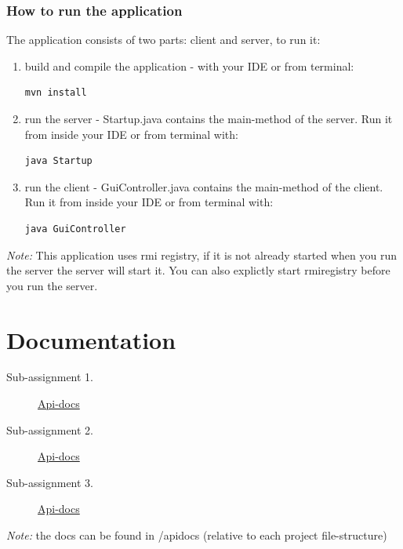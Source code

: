 \documentclass[a4paper, 11pt]{article}
\begin{document}
\subsubsection{How to run the application}
The application consists of two parts: client and server, to run it:
\begin{enumerate}
\item build and compile the application - with your IDE or from terminal:
\begin{verbatim}
mvn install
\end{verbatim}
\item run the server - Startup.java contains the main-method of the server. Run it from inside your IDE or from terminal with: 
\begin{verbatim}
java Startup
\end{verbatim}
\item run the client - GuiController.java contains the main-method of the client. Run it from inside your IDE or from terminal with: 
\begin{verbatim}
java GuiController
\end{verbatim}
\end{enumerate}
\textit{Note:} This application uses rmi registry, if it is not already started when you run the server the server will start it. You can also explictly start rmiregistry before you run the server.
\section{Documentation}
\begin{description}
\item[Sub-assignment 1.] \href{./../ID2212project_assignment1/apidocs/index.html}{Api-docs} 
\item[Sub-assignment 2.] \href{./../ID2212project_assignment2/apidocs/index.html}{Api-docs}
\item[Sub-assignment 3.] \href{./../ID2212project_assignment3/apidocs/index.html}{Api-docs}
\end{description}
\textit{Note:} the docs can be found in /apidocs (relative to each project file-structure)
\newpage
\nocite{*}


\end{document}
